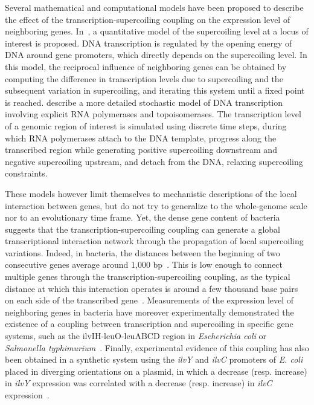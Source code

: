Several mathematical and computational models have been proposed to describe the effect of the transcription-supercoiling coupling on the expression level of neighboring genes.
In~\cite{meyer2014}, a quantitative model of the supercoiling level at a locus of interest is proposed.
DNA transcription is regulated by the opening energy of DNA around gene promoters, which directly depends on the supercoiling level.
In this model, the reciprocal influence of neighboring genes can be obtained by computing the difference in transcription levels due to supercoiling and the subsequent variation in supercoiling, and iterating this system until a fixed point is reached.
\cite{elhoudaigui2019} describe a more detailed stochastic model of DNA transcription involving explicit RNA polymerases and topoisomerases.
The transcription level of a genomic region of interest is simulated using discrete time steps, during which RNA polymerases attach to the DNA template, progress along the transcribed region while generating positive supercoiling downstream and negative supercoiling upstream, and detach from the DNA, relaxing supercoiling constraints.

These models however limit themselves to mechanistic descriptions of the local interaction between genes, but do not try to generalize to the whole-genome scale nor to an evolutionary time frame.
Yet, the dense gene content of bacteria suggests that the transcription-supercoiling coupling can generate a global transcriptional interaction network through the propagation of local supercoiling variations.
Indeed, in bacteria, the distances between the beginning of two consecutive genes average around 1,000 bp~\citep{blattner1997}.
This is low enough to connect multiple genes through the transcription-supercoiling coupling, as the typical distance at which this interaction operates is around a few thousand base pairs on each side of the transcribed gene~\citep{elhanafi2000}.
Measurements of the expression level of neighboring genes in bacteria have moreover experimentally demonstrated the existence of a coupling between transcription and supercoiling in specific gene systems, such as the ilvIH-leuO-leuABCD region in \emph{Escherichia coli} or \emph{Salmonella typhimurium}~\citep{elhanafi2000,sobetzko2016, dorman2016}.
Finally, experimental evidence of this coupling has also been obtained in a synthetic system using the \emph{ilvY} and \emph{ilvC} promoters of \emph{E. coli} placed in diverging orientations on a plasmid, in which a decrease (resp. increase) in \emph{ilvY} expression was correlated with a decrease (resp. increase) in \emph{ilvC} expression~\citep{rhee1999}.



